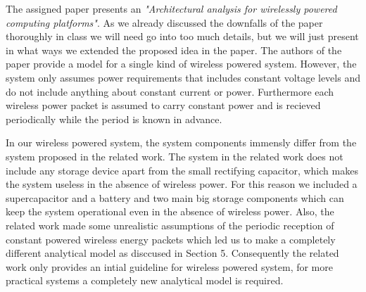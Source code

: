 The assigned paper \cite{paper} presents an \emph{"Architectural analysis for wirelessly powered computing platforms"}. As we already discussed the downfalls of the paper thoroughly in class we will need go into too much details, but we will just present in what ways we extended the proposed idea in the paper. The authors of the paper provide a model for a single kind of wireless powered system. However, the system only assumes power requirements that includes constant voltage levels and do not include anything about constant current or power. Furthermore each wireless power packet is assumed to carry constant power and is recieved periodically while the period is known in advance. 

In our wireless powered system, the system components immensly differ from the system proposed in the related work. The system in the related work does not include any storage device apart from the small rectifying capacitor, which makes the system useless in the absence of wireless power. For this reason we included a supercapacitor and a battery and two main big storage components which can keep the system operational even in the absence of wireless power. Also, the related work made some unrealistic assumptions of the periodic reception of constant powered wireless energy packets which led us to make a completely different analytical model as disccused in Section 5. Consequently the related work only provides an intial guideline for wireless powered system, for more practical systems a completely new analytical model is required.      
 